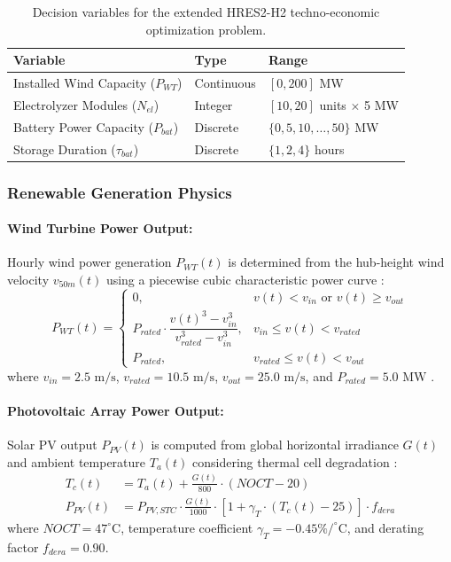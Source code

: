 \begin{table}[htbp]
\centering
\caption{Decision variables for the extended HRES2-H2 techno-economic optimization problem.}
\label{tab:hres2_decision_vars}
\vspace{2mm}
\begin{tabular}{lll}
\toprule
\textbf{Variable} & \textbf{Type} & \textbf{Range} \\
\midrule
Installed Wind Capacity ($P_{WT}$) & Continuous & $[0, 200]$ MW \\
 Electrolyzer Modules ($N_{el}$) & Integer & $[10, 20]$ units $\times$ 5 MW \\
Battery Power Capacity ($P_{bat}$) & Discrete & $\{0, 5, 10, \dots, 50\}$ MW \\
Storage Duration ($\tau_{bat}$) & Discrete & $\{1, 2, 4\}$ hours \\
\bottomrule
\end{tabular}
\end{table}


\subsubsection{Renewable Generation Physics}

\paragraph{Wind Turbine Power Output:}
Hourly wind power generation $P_{WT}(t)$ is determined from the hub-height wind velocity $v_{50m}(t)$ using a piecewise cubic characteristic power curve \cite{su2023capacity}:
\begin{equation}
P_{WT}(t) = \begin{cases}
0, & v(t) < v_{in} \text{ or } v(t) \ge v_{out} \\
P_{rated} \cdot \dfrac{v(t)^3 - v_{in}^3}{v_{rated}^3 - v_{in}^3}, & v_{in} \le v(t) < v_{rated} \\
P_{rated}, & v_{rated} \le v(t) < v_{out}
\end{cases}
\label{eq:wind_power_curve}
\end{equation}
where $v_{in} = 2.5\text{ m/s}$, $v_{rated} = 10.5\text{ m/s}$, $v_{out} = 25.0\text{ m/s}$, and $P_{rated} = 5.0\text{ MW}$ \cite{li2024capacity}.

\paragraph{Photovoltaic Array Power Output:}
Solar PV output $P_{PV}(t)$ is computed from global horizontal irradiance $G(t)$ and ambient temperature $T_a(t)$ considering thermal cell degradation \cite{smaoui2015optimal}:
\begin{align}
T_c(t) &= T_a(t) + \frac{G(t)}{800} \cdot (NOCT - 20) \label{eq:pv_cell_temp} \\
P_{PV}(t) &= P_{PV,STC} \cdot \frac{G(t)}{1000} \cdot \left[ 1 + \gamma_T \cdot (T_c(t) - 25) \right] \cdot f_{dera} \label{eq:pv_power_output}
\end{align}
where $NOCT = 47^\circ\text{C}$, temperature coefficient $\gamma_T = -0.45\%/^\circ\text{C}$, and derating factor $f_{dera} = 0.90$.


